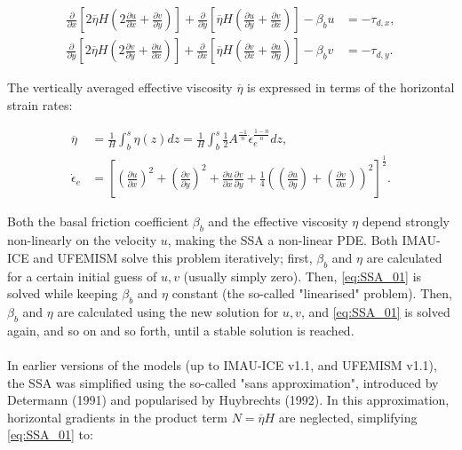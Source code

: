 \documentclass{article}
\begin{document}
\begin{align} \label{eq:SSA_01}
\frac{\partial}{\partial x} \left[ 2 \overline{\eta} H \left( 2 \frac{\partial u}{\partial x} + 
\frac{\partial v}{\partial y} \right) \right] + 
\frac{\partial}{\partial y} \left[ \overline{\eta} H \left( \frac{\partial u}{\partial y} + 
\frac{\partial v}{\partial x} \right) \right] - \beta_b u &= -\tau_{d,x}, \\
\frac{\partial}{\partial y} \left[ 2 \overline{\eta} H \left( 2 \frac{\partial v}{\partial y} + 
\frac{\partial u}{\partial x} \right) \right] + 
\frac{\partial}{\partial x} \left[ \overline{\eta} H \left( \frac{\partial v}{\partial x} + 
\frac{\partial u}{\partial y} \right) \right] - \beta_b v &= -\tau_{d,y}.
\end{align}

The vertically averaged effective viscosity $\overline{\eta}$ is expressed in terms of the horizontal strain rates:

\begin{align} \label{eq:SSA_02}
\overline{\eta} &= \frac{1}{H} \int_b^s \eta(z) dz 
= \frac{1}{H} \int_b^s \frac12 A^{\frac{-1}{n}} \dot{\epsilon}_e^{\frac{1-n}{n}} dz, \\
{\dot{\epsilon}}_e &= {\left[ {\left( \frac{\partial u}{\partial x} \right) }^2 + {\left( \frac{\partial v}{\partial y} \right) }^2 + \frac{\partial u}{\partial x} \frac{\partial v}{\partial y} + \frac14 {\left( {\left( \frac{\partial u}{\partial y} \right) } + {\left( \frac{\partial v}{\partial x} \right) } \right)}^2 \right] }^{\frac12}.
\end{align}

Both the basal friction coefficient $\beta_b$ and the effective viscosity $\eta$ depend strongly non-linearly on the velocity $u$, making the SSA a non-linear PDE. Both IMAU-ICE and UFEMISM solve this problem iteratively; first, $\beta_b$ and $\eta$ are calculated for a certain initial guess of $u,v$ (usually simply zero). Then, \eqref{eq:SSA_01} is solved while keeping $\beta_b$ and $\eta$ constant (the so-called "linearised" problem). Then, $\beta_b$ and $\eta$ are calculated using the new solution for $u,v$, and \eqref{eq:SSA_01} is solved again, and so on and so forth, until a stable solution is reached.\\
\\
In earlier versions of the models (up to IMAU-ICE v1.1, and UFEMISM v1.1), the SSA was simplified using the so-called "sans approximation", introduced by Determann (1991) and popularised by Huybrechts (1992). In this approximation, horizontal gradients in the product term $N = \overline{\eta} H$ are neglected, simplifying \eqref{eq:SSA_01} to:
\end{document}
